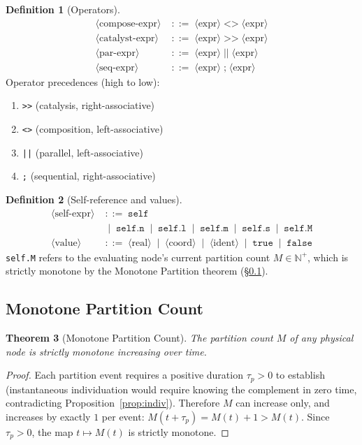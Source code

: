 \documentclass[twocolumn,11pt,a4paper]{article}
\newtheorem{theorem}{Theorem}[section]
\theoremstyle{definition}
\newtheorem{definition}[theorem]{Definition}
\theoremstyle{remark}
\newcommand{\bnfeq}{\;{::=}\;}
\newcommand{\bnfor}{\;\mid\;}
\begin{document}
\begin{definition}[Operators]
\begin{align*}
\langle\text{compose-expr}\rangle
  &\bnfeq \langle\text{expr}\rangle\;\texttt{<>}\;\langle\text{expr}\rangle\\
\langle\text{catalyst-expr}\rangle
  &\bnfeq \langle\text{expr}\rangle\;\texttt{>>}\;\langle\text{expr}\rangle\\
\langle\text{par-expr}\rangle
  &\bnfeq \langle\text{expr}\rangle\;\texttt{||}\;\langle\text{expr}\rangle\\
\langle\text{seq-expr}\rangle
  &\bnfeq \langle\text{expr}\rangle\;\texttt{;}\;\langle\text{expr}\rangle
\end{align*}
Operator precedences (high to low):
\begin{enumerate}[noitemsep,topsep=2pt]
\item \texttt{>>} (catalysis, right-associative)
\item \texttt{<>} (composition, left-associative)
\item \texttt{||} (parallel, left-associative)
\item \texttt{;} (sequential, right-associative)
\end{enumerate}
\end{definition}

\begin{definition}[Self-reference and values]
\begin{align*}
\langle\text{self-expr}\rangle
  &\bnfeq \texttt{self}\\
  &\bnfor \texttt{self.n} \bnfor \texttt{self.l} \bnfor \texttt{self.m}
          \bnfor \texttt{self.s} \bnfor \texttt{self.M}\\
\langle\text{value}\rangle
  &\bnfeq \langle\text{real}\rangle \bnfor \langle\text{coord}\rangle
          \bnfor \langle\text{ident}\rangle \bnfor \texttt{true} \bnfor \texttt{false}
\end{align*}
\texttt{self.M} refers to the evaluating node's current partition count
$M \in \mathbb{N}^+$, which is strictly monotone by the Monotone
Partition theorem (\S\ref{sec:monotone}).
\end{definition}

\subsection{Monotone Partition Count}
\label{sec:monotone}

\begin{theorem}[Monotone Partition Count]
\label{thm:monotone}
The partition count $M$ of any physical node is strictly monotone
increasing over time.
\end{theorem}
\begin{proof}
Each partition event requires a positive duration $\tau_p > 0$ to
establish (instantaneous individuation would require knowing the
complement in zero time, contradicting
Proposition~\ref{prop:indiv}).  Therefore $M$ can increase only, and
increases by exactly $1$ per event: $M(t + \tau_p) = M(t) + 1 > M(t)$.
Since $\tau_p > 0$, the map $t \mapsto M(t)$ is strictly monotone.
\end{proof}
\end{document}
